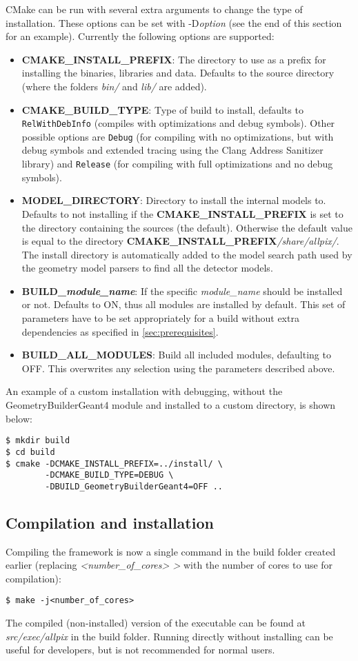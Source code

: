 CMake can be run with several extra arguments to change the type of installation. These options can be set with -D\textit{option} (see the end of this section for an example). Currently the following options are supported:
\begin{itemize}
\item \textbf{CMAKE\_INSTALL\_PREFIX}: The directory to use as a prefix for installing the binaries, libraries and data. Defaults to the source directory (where the folders \textit{bin/} and \textit{lib/} are added). 
\item \textbf{CMAKE\_BUILD\_TYPE}: Type of build to install, defaults to \texttt{RelWithDebInfo} (compiles with optimizations and debug symbols). Other possible options are \texttt{Debug} (for compiling with no optimizations, but with debug symbols and extended tracing using the Clang Address Sanitizer library) and \texttt{Release} (for compiling with full optimizations and no debug symbols). 
\item \textbf{MODEL\_DIRECTORY}: Directory to install the internal models to. Defaults to not installing if the \textbf{CMAKE\_INSTALL\_PREFIX} is set to the directory containing the sources (the default). Otherwise the default value is equal to the directory \textbf{CMAKE\_INSTALL\_PREFIX}\-\textit{/share/allpix/}. The install directory is automatically added to the model search path used by the geometry model parsers to find all the detector models.
\item \textbf{BUILD\_\textit{module\_name}}: If the specific \textit{module\_name} should be installed or not. Defaults to ON, thus all modules are installed by default. This set of parameters have to be set appropriately for a build without extra dependencies as specified in \ref{sec:prerequisites}.
\item \textbf{BUILD\_ALL\_MODULES}: Build all included modules, defaulting to OFF. This overwrites any selection using the parameters described above.
\end{itemize}

An example of a custom installation with debugging, without the GeometryBuilderGeant4 module and installed to a custom directory, is shown below:
\begin{verbatim}
$ mkdir build
$ cd build
$ cmake -DCMAKE_INSTALL_PREFIX=../install/ \
        -DCMAKE_BUILD_TYPE=DEBUG \
        -DBUILD_GeometryBuilderGeant4=OFF ..
\end{verbatim}

\subsection{Compilation and installation}
Compiling the framework is now a single command in the build folder created earlier (replacing \textit{\textless number\_of\_cores> \textgreater} with the number of cores to use for compilation):
\begin{verbatim}
$ make -j<number_of_cores>
\end{verbatim}
The compiled (non-installed) version of the executable can be found at \textit{src/exec/allpix} in the build folder. Running \apsq directly without installing can be useful for developers, but is not recommended for normal users.

